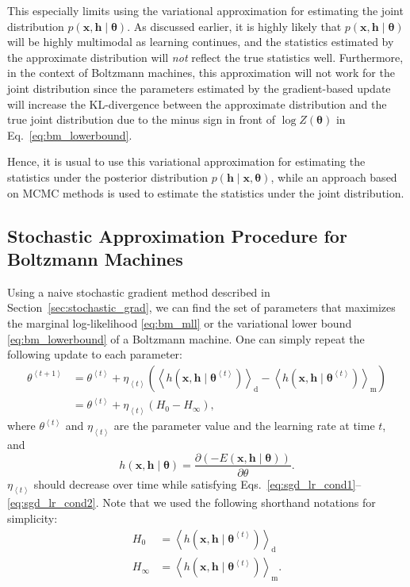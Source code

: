 \documentclass[dissertation,nocontribution,draft*]{aaltoseries}
\newcommand{\qt}[1]{\left<#1\right>}
\newcommand{\vect}[1]{\mathbf{#1}}
\newcommand{\vects}[1]{\boldsymbol{#1}}
\newcommand{\vh}[0]{\vect{h}}
\newcommand{\vx}[0]{\vect{x}}
\newcommand{\td}[0]{\text{d}}
\newcommand{\tf}[0]{\text{m}}
\newcommand{\TT}[0]{{\vects{\theta}}}
\begin{document}
This especially limits using the variational approximation
for estimating the joint distribution ${p(\vx, \vh \mid
\TT)}$. As discussed earlier, it is highly likely that
${p(\vx, \vh \mid \TT)}$ will be highly multimodal as
learning continues, and the statistics estimated by the
approximate distribution will \textit{not} reflect the true
statistics well. Furthermore, in the context of Boltzmann
machines, this approximation will not work for the joint
distribution since the parameters estimated by the
gradient-based update will increase the KL-divergence
between the approximate distribution and the true joint
distribution due to the minus sign in front of $\log Z(\TT)$
in Eq.~\eqref{eq:bm_lowerbound}.

Hence, it is usual to use this variational approximation for
estimating the statistics under the posterior distribution
${p(\vh \mid \vx, \TT)}$, while an approach based on MCMC
methods is used to estimate the statistics under the joint
distribution. 

\subsection{Stochastic Approximation Procedure for Boltzmann Machines}
\label{sec:sap}

Using a naive stochastic gradient method described in
Section~\ref{sec:stochastic_grad}, we can find the set of
parameters that maximizes the marginal log-likelihood
\eqref{eq:bm_mll} or the variational lower bound
\eqref{eq:bm_lowerbound} of a Boltzmann machine. One can
simply repeat the following update to each parameter:
\begin{align}
    \theta^{\qt{t+1}} &= \theta^{\qt{t}} + \eta_{\qt{t}} \left( 
    \left< h(\vx, \vh\mid \TT^{\qt{t}})
    \right>_\td 
    -
    \left< h(\vx, \vh\mid \TT^{\qt{t}})
    \right>_\tf \right) 
    \nonumber
    \\
    \label{eq:sap_grad}
    &= \theta^{\qt{t}} + \eta_{\qt{t}} \left( H_0 - H_\infty \right),
\end{align}
where $\theta^{\qt{t}}$ and $\eta_{\qt{t}}$ are the parameter value and
the learning rate at time $t$, and
\[
h(\vx, \vh \mid \TT) = \frac{\partial
    \left(-E(\vx, \vh\mid\TT)\right)}{\partial \theta}.
\]
$\eta_{\qt{t}}$ should decrease over time while satisfying
Eqs.~\eqref{eq:sgd_lr_cond1}--\eqref{eq:sgd_lr_cond2}. Note
that we used the following shorthand notations for
simplicity:
\begin{align*}
    H_0 &= \left< h(\vx, \vh\mid \TT^{\qt{t}})
    \right>_\td \\
    H_\infty &= \left< h(\vx, \vh\mid \TT^{\qt{t}})
    \right>_\tf.
\end{align*}
\end{document}
